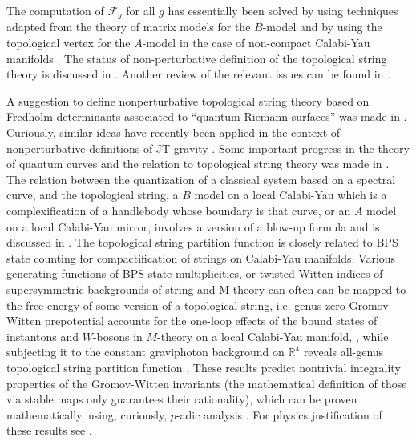 \documentclass[12pt]{article}
\newcommand\CalF{\mathcal{F}}
\begin{document}
The computation of ${\CalF}_g$ for all $g$
has essentially been solved by using techniques adapted from the
theory of matrix models
for the $B$-model \cite{Bouchard:2007ys,Eynard:2014zxa}
 and by using the topological vertex for the $A$-model in the
case of non-compact Calabi-Yau manifolds
\cite{Aganagic:2003db}. The status of non-perturbative definition of the topological string theory is discussed in \cite{Commando}.
Another review of the relevant issues can be found in \cite{Marino:2012zq}. 

A suggestion
to define nonperturbative topological string theory based on Fredholm
determinants associated to ``quantum Riemann surfaces''  was made in
\cite{Grassi:2014zfa,Codesido:2015dia,Marino:2015nla,Grassi:2019coc}.  Curiously, similar ideas have recently been applied
in the context of nonperturbative definitions of JT gravity \cite{Johnson:2021zuo}.
Some important progress in the theory of quantum curves and the relation
to topological string theory was made in 
\cite{Coman:2018uwk, Coman:2019eex, Coman:2020qgf,Grassi:2022zuk}. The relation between the quantization of a classical system based on a spectral curve, and the topological string, a $B$ model on a local Calabi-Yau which is a complexification of a handlebody whose boundary is that curve, or an $A$ model on a local Calabi-Yau mirror, involves a version of a blow-up formula and is discussed in \cite{Commando}. 
The topological string partition function is closely related 
to BPS state counting for compactification of strings on 
Calabi-Yau manifolds.  Various  generating functions of BPS state multiplicities, 
or twisted Witten indices of supersymmetric
backgrounds of string and M-theory can often can be mapped
to the free-energy of some version of a topological string,
i.e. genus zero Gromov-Witten prepotential accounts for the
one-loop effects of the bound states of instantons and $W$-bosons in $M$-theory on a local Calabi-Yau manifold, 
\cite{Lawrence:1997jr}, while subjecting it to the constant graviphoton background on ${\mathbb R}^4$ reveals all-genus
topological string partition function \cite{Gopakumar:1998ii, Gopakumar:1998jq}. 
These results predict  nontrivial integrality properties
of the Gromov-Witten invariants (the mathematical definition of those via stable maps only guarantees their rationality), which can be proven mathematically, using, curiously, $p$-adic analysis \cite{Kontsevich:2006an}. For physics 
justification of these results see \cite{Dedushenko:2014nya}. 
\end{document}
